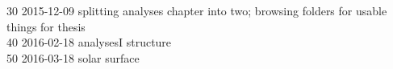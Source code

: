 \begin{titlepage}
\begin{footnotesize}
30	2015-12-09	splitting analyses chapter into two; browsing folders for usable things for thesis\\
40	2016-02-18	analysesI structure\\
50	2016-03-18	solar surface\\

\end{footnotesize}
\end{titlepage}
